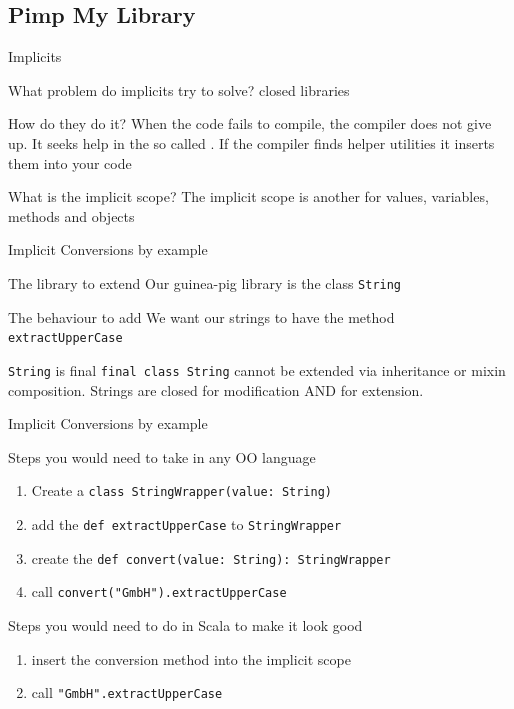 \subsection{Pimp My Library}
\begin{frame}{Implicits}
\begin{block}{What problem do implicits try to solve?}
 \alert{closed} libraries
\end{block}
\pause
\begin{block}{How do they do it?}
When the code fails to compile, the compiler does not give up. It seeks help in
the so called . If the compiler finds helper utilities
it  inserts them into your code
\end{block}
\pause
\begin{block}{What is the implicit scope?}
The implicit scope is another  for values, variables,
methods and objects
\end{block}
\end{frame}

\begin{frame}[fragile]{Implicit Conversions by example}
\begin{block}{The library to extend}
Our guinea-pig library is the class \lstinline!String!
\end{block}
\pause
\begin{block}{The behaviour to add}
We want our strings to have the method \lstinline!extractUpperCase!
\end{block}
\pause
\begin{alertblock}{\lstinline!String! is final}
\lstinline!final class String! cannot be extended via inheritance or mixin
composition. Strings are closed for modification AND for extension.
\end{alertblock}
\end{frame}

\begin{frame}[fragile]{Implicit Conversions by example}
\begin{block}{Steps you would need to take in any OO language}
\begin{enumerate}
  \item Create a \lstinline!class StringWrapper(value: String)!
  \item add the \lstinline!def extractUpperCase! to \lstinline!StringWrapper!
  \item create the \lstinline!def convert(value: String): StringWrapper!
  \item call \lstinline!convert("GmbH").extractUpperCase!
\end{enumerate}
\end{block}
\pause
\begin{exampleblock}{Steps you would need to do in Scala to make it look good}
\begin{enumerate}
  \item insert the conversion method into the implicit scope
  \item call \lstinline!"GmbH".extractUpperCase!
\end{enumerate}
\end{exampleblock}
\end{frame}

